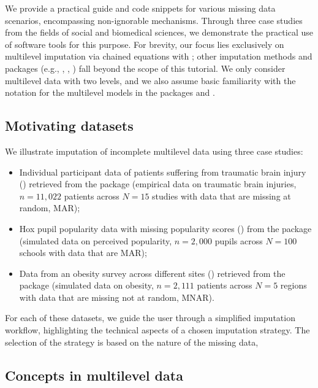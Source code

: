 \documentclass[
  article]{jss}
\providecommand{\tightlist}{%
  \setlength{\itemsep}{0pt}\setlength{\parskip}{0pt}}
\begin{document}
We provide a practical guide and code snippets for various missing data
scenarios, encompassing non-ignorable mechanisms. Through three case
studies from the fields of social and biomedical sciences, we
demonstrate the practical use of software tools for this purpose. For
brevity, our focus lies exclusively on multilevel imputation via chained
equations with ; other imputation methods and packages (e.g.,
 \citet{grun18},  \citet{smcfcs}, 
\citet{mdmb}) fall beyond the scope of this tutorial. We only consider
multilevel data with two levels, and we also assume basic familiarity
with the notation for the multilevel models in the  packages
 \citet{lme4} and  \citet{nlme}.

\subsection{Motivating datasets}\label{motivating-datasets}

We illustrate imputation of incomplete multilevel data using three case
studies:

\begin{itemize}
\tightlist
\item
  Individual participant data of patients suffering from traumatic brain
  injury () retrieved from the  package
  \citet{metamisc} (empirical data on traumatic brain injuries,
  \(n = 11,022\) patients across \(N = 15\) studies with data that are
  missing at random, MAR);
\item
  Hox pupil popularity data with missing popularity scores
  () from the  package \citep{mice} (simulated
  data on perceived popularity, \(n = 2,000\) pupils across \(N = 100\)
  schools with data that are MAR);
\item
  Data from an obesity survey across different sites ()
  retrieved from the  package \citet{micemd} (simulated data
  on obesity, \(n = 2,111\) patients across \(N = 5\) regions with data
  that are missing not at random, MNAR).
\end{itemize}

For each of these datasets, we guide the user through a simplified
imputation workflow, highlighting the technical aspects of a chosen
imputation strategy. The selection of the strategy is based on the
nature of the missing data,

\subsection{Concepts in multilevel data}\label{sec-2conmulti}
\end{document}
